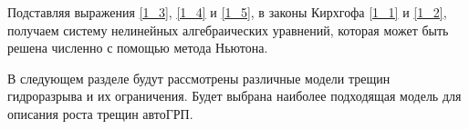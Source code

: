 Подставляя выражения \eqref{1_3}, \eqref{1_4} и \eqref{1_5}, в законы Кирхгофа \eqref{1_1} и \eqref{1_2}, получаем систему нелинейных алгебраических уравнений, которая может быть решена численно с помощью метода Ньютона.

В следующем разделе будут рассмотрены различные модели трещин гидроразрыва и их ограничения.
Будет выбрана наиболее подходящая модель для описания роста трещин автоГРП.



